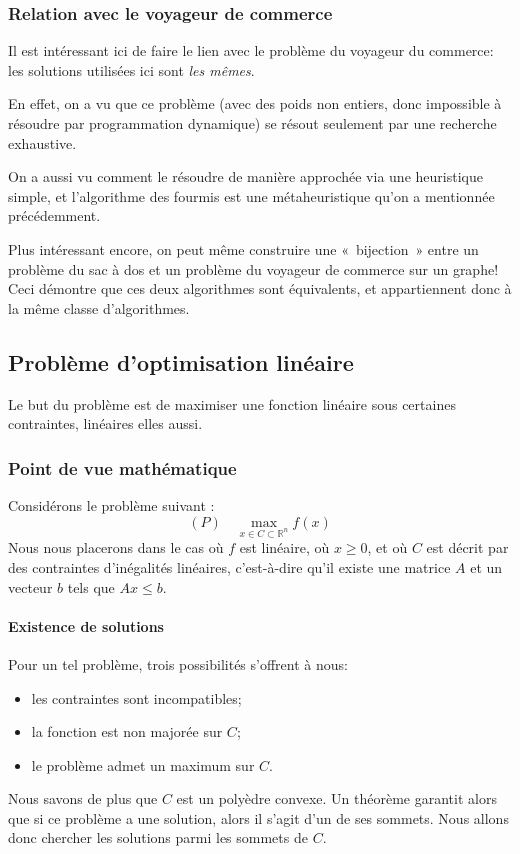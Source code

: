   \subsubsection{Relation avec le voyageur de commerce}
    Il est intéressant ici de faire le lien avec le problème du voyageur
    du commerce: les solutions utilisées ici sont \emph{les mêmes}.

    En effet, on a vu que ce problème (avec des poids non entiers, donc impossible
    à résoudre par programmation dynamique) se résout seulement par une recherche
    exhaustive.
    
    On a aussi vu comment le résoudre de manière approchée via une heuristique
    simple, et l'algorithme des fourmis est une métaheuristique qu'on a mentionnée
    précédemment.


    Plus intéressant encore, on peut même construire une «~bijection~» entre un
    problème du sac à dos
    et un problème du voyageur de commerce sur un graphe\cite{knapsack_to_tsp}!
    Ceci démontre que ces deux algorithmes sont équivalents, et appartiennent donc à la même
    classe d'algorithmes. %

\subsection{Problème d'optimisation linéaire}
  Le but du problème est de maximiser une fonction linéaire sous certaines
  contraintes, linéaires elles aussi.

  \subsubsection{Point de vue mathématique}
      Considérons le problème suivant :
      $$ (P) \quad \max_{x\in C \subset \mathbb{R}^n} f(x)$$
      Nous nous placerons dans le cas où $f$ est linéaire, où $x \geqslant 0$,
      et où $C$ est décrit par des contraintes d'inégalités linéaires,
      c'est-à-dire qu'il existe une matrice $A$ et un vecteur $b$ tels
      que $Ax\leqslant b$.

    \paragraph{Existence de solutions}
      Pour un tel problème, trois possibilités s'offrent à nous:
      \begin{itemize}
        \item les contraintes sont incompatibles;
        \item la fonction est non majorée sur $C$;
        \item le problème admet un maximum sur $C$.
      \end{itemize}
      Nous savons de plus que $C$ est un polyèdre convexe. Un théorème garantit
      alors que si ce problème a une solution, alors il s'agit d'un de
      ses sommets. Nous allons donc chercher les solutions parmi les sommets de
      $C$.

